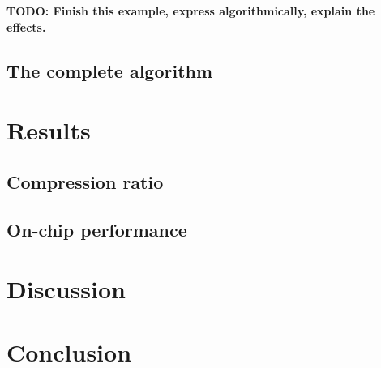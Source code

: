 \documentclass[conference]{IEEEtran}
\begin{document}
  \textbf{TODO: Finish this example, express algorithmically, explain the effects.}

  \subsection{The complete algorithm}

  \section{Results}

  \subsection{Compression ratio}

  \subsection{On-chip performance}

  \section{Discussion}

  \section{Conclusion}
\end{document}
